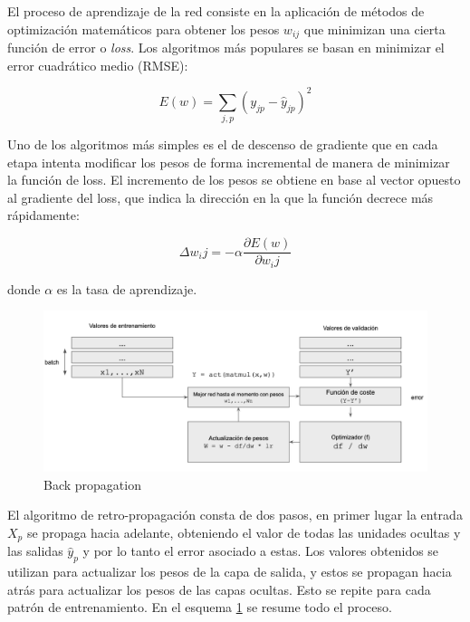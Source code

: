 El proceso de aprendizaje de la red consiste en la aplicación de métodos de optimización matemáticos para obtener los pesos $w_{ij}$ 
que minimizan una cierta función de error o \textit{loss}. Los algoritmos más populares se basan en minimizar el error cuadrático 
medio (RMSE):

\begin{equation}
    E(w) = \sum_{j,p}(y_{jp}-\hat{y}_{jp})^2
\end{equation}

Uno de los algoritmos más simples es el de descenso de gradiente que en cada etapa intenta modificar los pesos de forma incremental de manera 
de minimizar la función de loss. El incremento de los pesos se obtiene en base al vector opuesto al gradiente del loss,
 que indica la dirección en la que la función decrece más rápidamente:

 \begin{equation}
    \Delta w_ij = -\alpha \frac{\partial E(w)}{\partial w_ij}
\end{equation}

donde $\alpha$ es la tasa de aprendizaje. 


\begin{figure}[h!]
    \begin{center}
      \includegraphics[height=2.in]{Figures/back_prop.png}
      \caption{ Back propagation }
      \label{backprop}
    \end{center}
  \end{figure}


El algoritmo de retro-propagación consta de dos pasos, en primer lugar la entrada $X_p$ se propaga hacia adelante, obteniendo el valor
de todas las unidades ocultas y las salidas $\hat{y}_p$ y por lo tanto el error asociado a estas. Los valores obtenidos se utilizan para actualizar
los pesos de la capa de salida, y estos se propagan hacia atrás para actualizar los pesos de las capas ocultas. Esto se repite para cada
patrón de entrenamiento. En el esquema \ref{backprop} se resume todo el proceso.


